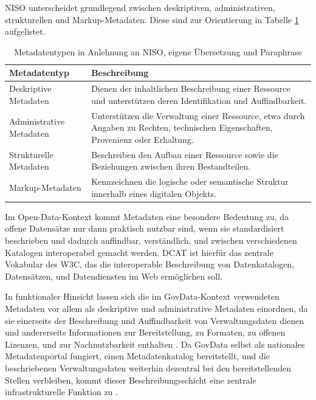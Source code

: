 NISO unterscheidet grundlegend zwischen deskriptiven, administrativen, strukturellen und Markup-Metadaten.
Diese sind zur Orientierung in Tabelle \ref{tab:metadaten_typen} aufgelistet.

\begin{table}[ht]
    \centering
        \begin{tabular}{p{4cm}p{9.5cm}}
        \hline
        \textbf{Metadatentyp} & \textbf{Beschreibung} \\
        \hline
        Deskriptive Metadaten & Dienen der inhaltlichen Beschreibung einer Ressource und unterstützen deren Identifikation und Auffindbarkeit. \\
        Administrative Metadaten & Unterstützen die Verwaltung einer Ressource, etwa durch Angaben zu Rechten, technischen Eigenschaften, Provenienz oder Erhaltung. \\
        Strukturelle Metadaten & Beschreiben den Aufbau einer Ressource sowie die Beziehungen zwischen ihren Bestandteilen. \\
        Markup-Metadaten & Kennzeichnen die logische oder semantische Struktur innerhalb eines digitalen Objekts. \\
        \hline
        \end{tabular}
        \captionsetup{justification=centering}
        \caption[Metadatentypen in Anlehnung an NISO, eigene Übersetzung und Paraphrase]{Metadatentypen in Anlehnung an NISO, eigene Übersetzung und Paraphrase \cite{Riley2017MetadataPrimer}}
    \label{tab:metadaten_typen}
\end{table}

Im Open-Data-Kontext kommt Metadaten eine besondere Bedeutung zu, da offene Datensätze nur dann praktisch nutzbar sind, wenn sie standardisiert beschrieben und dadurch auffindbar, verständlich, und zwischen verschiedenen Katalogen interoperabel gemacht werden.
DCAT ist hierfür das zentrale Vokabular des \acrfull{W3C}, das die interoperable Beschreibung von Datenkatalogen, Datensätzen, und Datendiensten im Web ermöglichen soll. \cite{W3CDCAT3}

In funktionaler Hinsicht lassen sich die im GovData-Kontext verwendeten Metadaten vor allem als deskriptive und administrative Metadaten einordnen, da sie einerseits der Beschreibung und Auffindbarkeit von Verwaltungsdaten dienen und andererseits Informationen zur Bereitstellung, zu Formaten, zu offenen Lizenzen, und zur Nachnutzbarkeit enthalten \cite{Riley2017MetadataPrimer,FitkoGovdata}.
Da GovData selbst als nationales Metadatenportal fungiert, einen Metadatenkatalog bereitstellt, und die beschriebenen Verwaltungsdaten weiterhin dezentral bei den bereitstellenden Stellen verbleiben, kommt dieser Beschreibungsschicht eine zentrale infrastrukturelle Funktion zu \cite{FitkoGovdata}.

